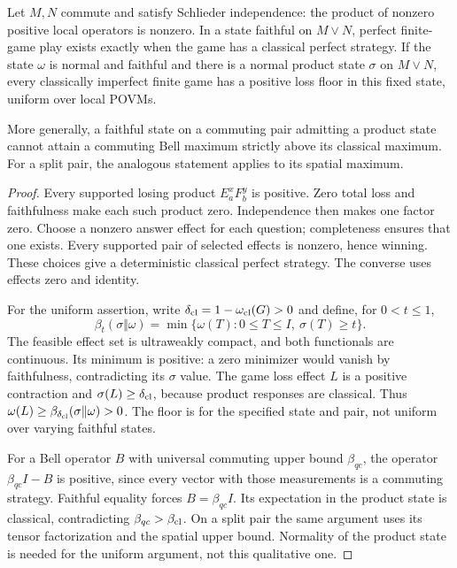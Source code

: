 \begin{theorem}\label{thm:faithful-floor}
Let $M,N$ commute and satisfy Schlieder independence: the product of nonzero positive local operators is nonzero. In a state faithful on $M\vee N$, perfect finite-game play exists exactly when the game has a classical perfect strategy. If the state $\omega$ is normal and faithful and there is a normal product state $\sigma$ on $M\vee N$, every classically imperfect finite game has a positive loss floor in this fixed state, uniform over local POVMs.

More generally, a faithful state on a commuting pair admitting a product state cannot attain a commuting Bell maximum strictly above its classical maximum. For a split pair, the analogous statement applies to its spatial maximum.
\end{theorem}
\begin{proof}
Every supported losing product $E_a^xF_b^y$ is positive. Zero total loss and faithfulness make each such product zero. Independence then makes one factor zero. Choose a nonzero answer effect for each question; completeness ensures that one exists. Every supported pair of selected effects is nonzero, hence winning. These choices give a deterministic classical perfect strategy. The converse uses effects zero and identity.

For the uniform assertion, write $\delta_{\rm cl}=1-\omega_{\rm cl}(G)>0$ and define, for $0<t\le1$,
\[
 \beta_t(\sigma\Vert\omega)=\min\{\omega(T):0\le T\le I,\ \sigma(T)\ge t\}.
\]
The feasible effect set is ultraweakly compact, and both functionals are continuous. Its minimum is positive: a zero minimizer would vanish by faithfulness, contradicting its $\sigma$ value. The game loss effect $L$ is a positive contraction and $\sigma(L)\ge\delta_{\rm cl}$, because product responses are classical. Thus $\omega(L)\ge\beta_{\delta_{\rm cl}}(\sigma\Vert\omega)>0$. The floor is for the specified state and pair, not uniform over varying faithful states.

For a Bell operator $B$ with universal commuting upper bound $\beta_{qc}$, the operator $\beta_{qc}I-B$ is positive, since every vector with those measurements is a commuting strategy. Faithful equality forces $B=\beta_{qc}I$. Its expectation in the product state is classical, contradicting $\beta_{qc}>\beta_{\rm cl}$. On a split pair the same argument uses its tensor factorization and the spatial upper bound. Normality of the product state is needed for the uniform argument, not this qualitative one.
\end{proof}

